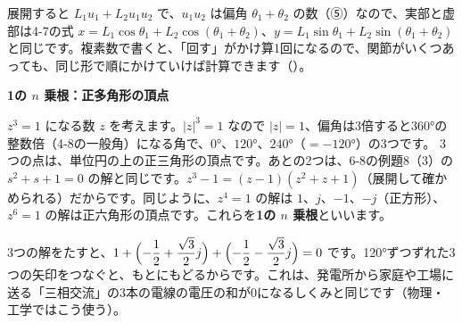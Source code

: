\par\vspace{4pt}
展開すると $L_1u_1+L_2u_1u_2$ で、$u_1u_2$ は偏角 $\theta_1+\theta_2$ の数（⑤）なので、実部と虚部は4-7の式 $x=L_1\cos\theta_1+L_2\cos(\theta_1+\theta_2)$、$y=L_1\sin\theta_1+L_2\sin(\theta_1+\theta_2)$ と同じです。複素数で書くと、「回す」がかけ算1回になるので、関節がいくつあっても、同じ形で順にかけていけば計算できます（）。

\begin{motto}[4]
\textbf{1の $n$ 乗根：正多角形の頂点}\par
$z^3=1$ になる数 $z$ を考えます。$|z|^3=1$ なので $|z|=1$、偏角は3倍すると360°の整数倍（4-8の一般角）になる角で、$0°$、$120°$、$240°$（$=-120°$）の3つです。
3つの点は、単位円の上の正三角形の頂点です。あとの2つは、6-8の例題8（3）の $s^2+s+1=0$ の解と同じです。$z^3-1=(z-1)(z^2+z+1)$（展開して確かめられる）だからです。同じように、$z^4=1$ の解は $1$、$j$、$-1$、$-j$（正方形）、$z^6=1$ の解は正六角形の頂点です。これらを\textbf{1の $n$ 乗根}といいます。
\par\vspace{2pt}
\begin{center}
\end{center}
3つの解をたすと、$1+\Bigl(-\dfrac12+\dfrac{\sqrt3}{2}j\Bigr)+\Bigl(-\dfrac12-\dfrac{\sqrt3}{2}j\Bigr)=0$ です。120°ずつずれた3つの矢印をつなぐと、もとにもどるからです。これは、発電所から家庭や工場に送る「三相交流」の3本の電線の電圧の和が0になるしくみと同じです（物理・工学ではこう使う）。
\end{motto}

